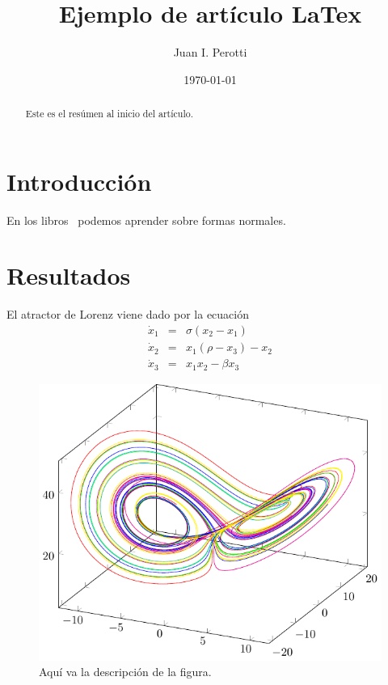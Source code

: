 \documentclass[aps,prl,twocolumn,groupedaddress]{revtex4-2}
\begin{document}
\title{Ejemplo de artículo LaTex}

\author{Juan I. Perotti}

\date{\today}

\begin{abstract}
Este es el resúmen al inicio del artículo.
\end{abstract}

\maketitle

\section{
\label{intro}
Introducción
}

En los libros~\cite{verhulst1985nonlinear,wiggins2003introduction} podemos aprender sobre formas normales.

\section{
\label{resultados}
Resultados
}

El atractor de Lorenz viene dado por la ecuación
\begin{eqnarray}
\label{eq1}
\dot{x}_1 &=& \sigma(x_2-x_1) \\
\dot{x}_2 &=& x_1(\rho-x_3)-x_2 \nonumber \\
\dot{x}_3 &=& x_1x_2-\beta x_3 \nonumber
\end{eqnarray}

\begin{figure}
\includegraphics*[scale=.9]{fig1.pdf}
\caption{
\label{fig1}
Aquí va la descripción de la figura.
}
\end{figure}
\end{document}
